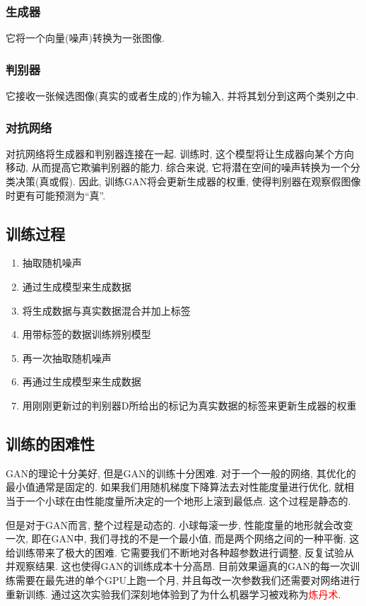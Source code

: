\documentclass[lang=cn,11pt]{elegantpaper}
\begin{document}
\subsubsection*{生成器}
它将一个向量(噪声)转换为一张图像. 
\subsubsection*{判别器}
它接收一张候选图像(真实的或者生成的)作为输入, 并将其划分到这两个类别之中. 
\subsubsection*{对抗网络}
对抗网络将生成器和判别器连接在一起. 训练时, 这个模型将让生成器向某个方向移动, 从而提高它欺骗判别器的能力. 综合来说, 它将潜在空间的噪声转换为一个分
类决策(真或假). 因此, 训练GAN将会更新生成器的权重, 使得判别器在观察假图像时更有可能预测为“真”. 


\subsection{训练过程}
\begin{enumerate}
  \item 抽取随机噪声
  \item 通过生成模型来生成数据
  \item 将生成数据与真实数据混合并加上标签
  \item 用带标签的数据训练辨别模型
  \item 再一次抽取随机噪声
  \item 再通过生成模型来生成数据
  \item 用刚刚更新过的判别器D所给出的标记为真实数据的标签来更新生成器的权重
\end{enumerate}

\subsection{训练的困难性}

GAN的理论十分美好, 但是GAN的训练十分困难. 对于一个一般的网络, 其优化的最小值通常是固定的. 如果我们用随机梯度下降算法去对性能度量进行优化, 就相当于一个小球在由性能度量所决定的一个地形上滚到最低点. 这个过程是静态的. 

但是对于GAN而言, 整个过程是动态的. 小球每滚一步, 性能度量的地形就会改变一次, 即在GAN中, 我们寻找的不是一个最小值, 而是两个网络之间的一种平衡. 这给训练带来了极大的困难. 它需要我们不断地对各种超参数进行调整, 反复试验从并观察结果. 这也使得GAN的训练成本十分高昂. 目前效果逼真的GAN的每一次训练需要在最先进的单个GPU上跑一个月, 并且每改一次参数我们还需要对网络进行重新训练. 通过这次实验我们深刻地体验到了为什么机器学习被戏称为\textcolor{red}{炼丹术}. 
\end{document}
